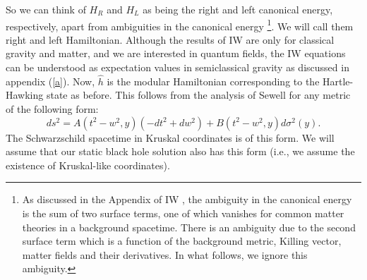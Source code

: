 \documentclass[12pt]{article}
\begin{document}
 So we can think of $H_R$ and $H_L$ as being the right and left canonical energy, respectively, apart from ambiguities in the canonical energy \footnote{As discussed in the Appendix of IW \cite{VR}, the ambiguity in the canonical energy is the sum of two surface terms, one of which vanishes for common matter theories in a background spacetime. There is an ambiguity due to the second surface term which is a function of the background metric, Killing vector, matter fields and their derivatives. In what follows, we ignore this ambiguity.}. We will call them right and left Hamiltonian. Although the results of IW are only for classical gravity and matter, and we are interested in quantum fields, the IW equations can be understood as expectation values in semiclassical gravity as discussed in appendix (\ref{a}). Now, $\hat{h}$ is the modular Hamiltonian corresponding to the Hartle-Hawking state as before. This follows from the analysis of Sewell \cite{GS} for any metric of the following form:
\begin{equation}
ds^2 = A(t^2 - w^2, y)(- dt^2 + dw^2) + B(t^2 - w^2,y) d\sigma^2(y).
\end{equation}
The Schwarzschild spacetime in Kruskal coordinates is of this form. We will assume that our static black hole solution also has this form (i.e., we assume the existence of Kruskal-like coordinates).
\end{document}
